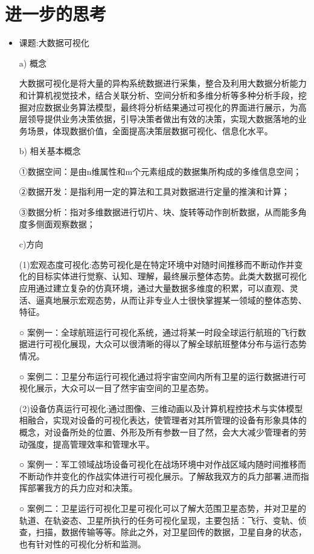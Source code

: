 \documentclass{article}
\begin{document}
\section{进一步的思考}

\begin{itemize}
   \item 课题:大数据可视化\par
    a) 概念\par
     大数据可视化是将大量的异构系统数据进行采集，整合及利用大数据分析能力和计算机视觉技术，结合关联分析、空间分析和多维分析等多种分析手段，挖掘对应数据业务算法模型，最终将分析结果通过可视化的界面进行展示，为高层领导提供业务决策依据，引导决策者做出有效的决策，实现大数据落地的业务场景，体现数据价值，全面提高决策层数据可视化、信息化水平。\par
    b) 相关基本概念\par
    ①数据空间：是由n维属性和m个元素组成的数据集所构成的多维信息空间；\par
    ②数据开发：是指利用一定的算法和工具对数据进行定量的推演和计算；\par
    ③数据分析：指对多维数据进行切片、块、旋转等动作剖析数据，从而能多角度多侧面观察数据；\par   
    c)方向\par
      (1)宏观态度可视化:态势可视化是在特定环境中对随时间推移而不断动作并变化的目标实体进行觉察、认知、理解，最终展示整体态势。此类大数据可视化应用通过建立复杂的仿真环境，通过大量数据多维度的积累，可以直观、灵活、逼真地展示宏观态势，从而让非专业人士很快掌握某一领域的整体态势、特征。\par
      ○	案例一：全球航班运行可视化系统，通过将某一时段全球运行航班的飞行数据进行可视化展现，大众可以很清晰的得以了解全球航班整体分布与运行态势情况。\par
      ○	案例二：卫星分布运行可视化通过将宇宙空间内所有卫星的运行数据进行可视化展示，大众可以一目了然宇宙空间的卫星态势。\par
      (2)设备仿真运行可视化:通过图像、三维动画以及计算机程控技术与实体模型相融合，实现对设备的可视化表达，使管理者对其所管理的设备有形象具体的概念，对设备所处的位置、外形及所有参数一目了然，会大大减少管理者的劳动强度，提高管理效率和管理水平。\par
      ○	案例一：军工领域战场设备可视化在战场环境中对作战区域内随时间推移而不断动作并变化的作战实体进行可视化展示。了解敌我双方的兵力部署,进而指挥部署我方的兵力应对和决策。\par
      ○	案例二：卫星运行可视化卫星可视化可以了解大范围卫星态势，并对卫星的轨道、在轨姿态、卫星所执行的任务可视化呈现，主要包括：飞行、变轨、侦查，扫描，数据传输等等。除此之外，对卫星回传的数据，卫星自身的状态，也有针对性的可视化分析和监测。\par

\end{itemize}
\end{document}
